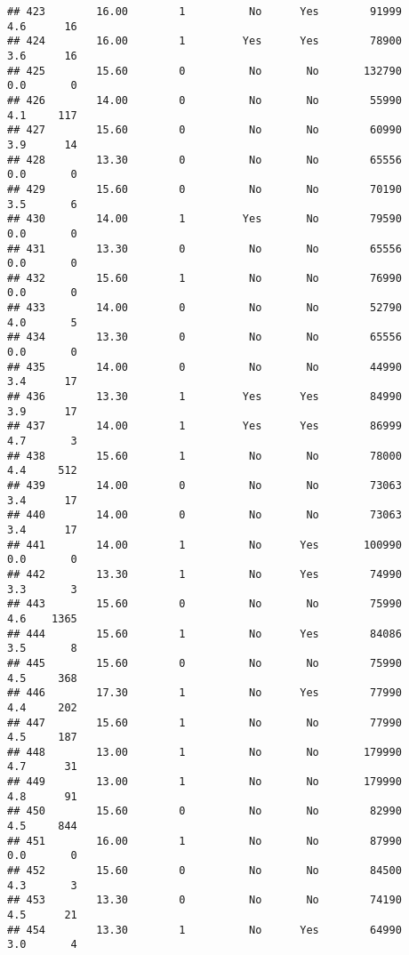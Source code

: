 \documentclass[
]{article}
\begin{document}
\begin{verbatim}
## 423        16.00        1          No      Yes        91999         4.6      16
## 424        16.00        1         Yes      Yes        78900         3.6      16
## 425        15.60        0          No       No       132790         0.0       0
## 426        14.00        0          No       No        55990         4.1     117
## 427        15.60        0          No       No        60990         3.9      14
## 428        13.30        0          No       No        65556         0.0       0
## 429        15.60        0          No       No        70190         3.5       6
## 430        14.00        1         Yes       No        79590         0.0       0
## 431        13.30        0          No       No        65556         0.0       0
## 432        15.60        1          No       No        76990         0.0       0
## 433        14.00        0          No       No        52790         4.0       5
## 434        13.30        0          No       No        65556         0.0       0
## 435        14.00        0          No       No        44990         3.4      17
## 436        13.30        1         Yes      Yes        84990         3.9      17
## 437        14.00        1         Yes      Yes        86999         4.7       3
## 438        15.60        1          No       No        78000         4.4     512
## 439        14.00        0          No       No        73063         3.4      17
## 440        14.00        0          No       No        73063         3.4      17
## 441        14.00        1          No      Yes       100990         0.0       0
## 442        13.30        1          No      Yes        74990         3.3       3
## 443        15.60        0          No       No        75990         4.6    1365
## 444        15.60        1          No      Yes        84086         3.5       8
## 445        15.60        0          No       No        75990         4.5     368
## 446        17.30        1          No      Yes        77990         4.4     202
## 447        15.60        1          No       No        77990         4.5     187
## 448        13.00        1          No       No       179990         4.7      31
## 449        13.00        1          No       No       179990         4.8      91
## 450        15.60        0          No       No        82990         4.5     844
## 451        16.00        1          No       No        87990         0.0       0
## 452        15.60        0          No       No        84500         4.3       3
## 453        13.30        0          No       No        74190         4.5      21
## 454        13.30        1          No      Yes        64990         3.0       4

\end{verbatim}
\end{document}
